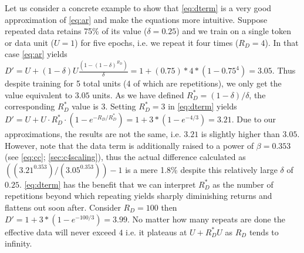 \documentclass{article}
\begin{document}
Let us consider a concrete example to show that \autoref{eq:dterm} is a very good approximation of \autoref{eq:ar} and make the equations more intuitive. Suppose repeated data retains 75\% of its value ($\delta=0.25$) and we train on a single token or data unit ($U=1$) for five epochs, i.e. we repeat it four times ($R_D=4$). In that case \autoref{eq:ar} yields $D'=U + (1-\delta)U\tfrac{(1-(1-\delta)^{R_D})}{\delta}=1+(0.75)*4*(1-0.75^4)=3.05$. Thus despite training for 5 total units (4 of which are repetitions), we only get the value equivalent to $3.05$ units. As we have defined $R_D^*=(1 - \delta)/\delta$, the corresponding $R_D^*$ value is $3$. Setting $R_D^*=3$ in \autoref{eq:dterm} yields $D'=U + U\cdot R_D^* \cdot(1- e^{-R_D/R_D^*})=1 + 3 * (1 - e^{-4/3})=3.21$. Due to our approximations, the results are not the same, i.e. $3.21$ is slightly higher than $3.05$. However, note that the data term is additionally raised to a power of $\beta=0.353$ (see \autoref{eq:cc}; \autoref{sec:c4scaling}), thus the actual difference calculated as $((3.21^{0.353}) / (3.05^{0.353})) - 1$ is a mere 1.8\% despite this relatively large $\delta$ of $0.25$. \autoref{eq:dterm} has the benefit that we can interpret $R_D^*$ as the number of repetitions beyond which repeating yields sharply diminishing returns and flattens out soon after. Consider $R_D=100$ then $D'=1 + 3 * (1 - e^{-100/3})=3.99$. No matter how many repeats are done the effective data will never exceed $4$ i.e. it plateaus at $U + R_D^*U$ as $R_D$ tends to infinity.






\end{document}
